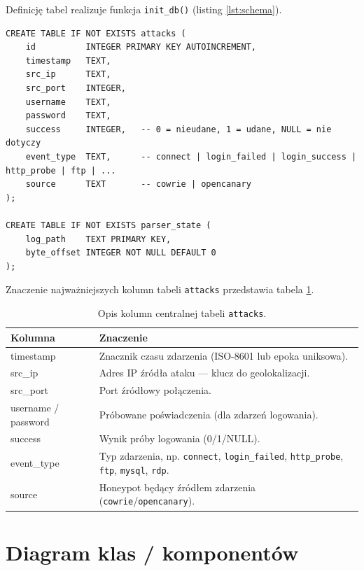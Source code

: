 \documentclass[12pt,a4paper]{report}
\begin{document}
Definicję tabel realizuje funkcja \texttt{init\_db()} (listing \ref{lst:schema}).

\begin{lstlisting}[style=sqlstyle,caption={Definicja schematu bazy danych (fragment).},label={lst:schema}]
CREATE TABLE IF NOT EXISTS attacks (
    id          INTEGER PRIMARY KEY AUTOINCREMENT,
    timestamp   TEXT,
    src_ip      TEXT,
    src_port    INTEGER,
    username    TEXT,
    password    TEXT,
    success     INTEGER,   -- 0 = nieudane, 1 = udane, NULL = nie dotyczy
    event_type  TEXT,      -- connect | login_failed | login_success | http_probe | ftp | ...
    source      TEXT       -- cowrie | opencanary
);

CREATE TABLE IF NOT EXISTS parser_state (
    log_path    TEXT PRIMARY KEY,
    byte_offset INTEGER NOT NULL DEFAULT 0
);
\end{lstlisting}

Znaczenie najważniejszych kolumn tabeli \texttt{attacks} przedstawia
tabela \ref{tab:cols}.

\begin{table}[ht]
\centering
\small
\begin{tabularx}{\textwidth}{>{\ttfamily}l X}
\toprule
\textnormal{\textbf{Kolumna}} & \textbf{Znaczenie} \\
\midrule
timestamp & Znacznik czasu zdarzenia (ISO-8601 lub epoka uniksowa). \\
src\_ip & Adres IP źródła ataku --- klucz do geolokalizacji. \\
src\_port & Port źródłowy połączenia. \\
username / password & Próbowane poświadczenia (dla zdarzeń logowania). \\
success & Wynik próby logowania (0/1/NULL). \\
event\_type & Typ zdarzenia, np. \texttt{connect}, \texttt{login\_failed}, \texttt{http\_probe}, \texttt{ftp}, \texttt{mysql}, \texttt{rdp}. \\
source & Honeypot będący źródłem zdarzenia (\texttt{cowrie}/\texttt{opencanary}). \\
\bottomrule
\end{tabularx}
\caption{Opis kolumn centralnej tabeli \texttt{attacks}.}
\label{tab:cols}
\end{table}

\section{Diagram klas / komponentów}
\end{document}
